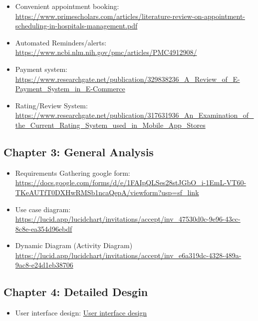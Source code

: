 \documentclass{article}
\begin{document}
\begin{itemize}
        \item Convenient appointment booking: \url{https://www.primescholars.com/articles/literature-review-on-appointment-scheduling-in-hospitals-management.pdf}
        \item Automated Reminders/alerts: \href{https://www.ncbi.nlm.nih.gov/pmc/articles/PMC4912908/}{https://www.ncbi.nlm.nih.gov/pmc/articles/PMC4912908/}
        \item Payment system: \url{https://www.researchgate.net/publication/329838236_A_Review_of_E-Payment_System_in_E-Commerce}
        \item Rating/Review System: \url{https://www.researchgate.net/publication/317631936_An_Examination_of_the_Current_Rating_System_used_in_Mobile_App_Stores}
    \end{itemize}
    \subsection{Chapter 3: General Analysis}
    \begin{itemize}
        \item Requirements Gathering google form: \href{https://docs.google.com/forms/d/e/1FAIpQLSes28stJGbO_i-1EmL-VT60-TKeAUTfT0DXHwRMSb1ncaQepA/viewform?usp=sf_link}{https://docs.google.com/forms/d/e/1FAIpQLSes28stJGbO\_i-1EmL-VT60-TKeAUTfT0DXHwRMSb1ncaQepA/viewform?usp=sf\_link}
        \item Use case diagram: \href{https://lucid.app/lucidchart/invitations/accept/inv_47530d0c-9e96-43cc-8c8e-ea354d96ebdf}{https://lucid.app/lucidchart/invitations/accept/inv\_47530d0c-9e96-43cc-8c8e-ea354d96ebdf}
        \item Dynamic Diagram (Activity Diagram) \url{https://lucid.app/lucidchart/invitations/accept/inv_e6a319dc-4328-489a-9ac8-e24d1eb38706}
    \end{itemize}
    \subsection{Chapter 4: Detailed Desgin}
    \begin{itemize}
       \item User interface design: \href{https://www.figma.com/proto/vcdFPDnXduhTrPKnwB27uj/Haircut?node-id=2-11&t=U3ZWMewK0ODQ4fIH-1&scaling=scale-down&page-id=0%3A1&starting-point-node-id=2%3A11&show-proto-sidebar=1}{User interface design}
    \end{itemize}
\end{document}

